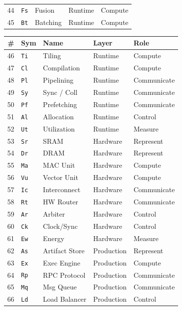 \begin{table}[!t]
\begin{minipage}[t]{0.49\textwidth}
\begin{tabular}{@{}r l l l l@{}}
44 & \texttt{Fs} & Fusion & Runtime & Compute \\
45 & \texttt{Bt} & Batching & Runtime & Compute \\
\bottomrule
\end{tabular}
\end{minipage}\hfill
\begin{minipage}[t]{0.49\textwidth}
\centering
\begin{tabular}{@{}r l l l l@{}}
\toprule
\textbf{\#} & \textbf{Sym} & \textbf{Name} & \textbf{Layer} & \textbf{Role} \\
\midrule
46 & \texttt{Ti} & Tiling & Runtime & Compute \\
47 & \texttt{Cl} & Compilation & Runtime & Compute \\
48 & \texttt{Pl} & Pipelining & Runtime & Communicate \\
49 & \texttt{Sy} & Sync / Coll & Runtime & Communicate \\
50 & \texttt{Pf} & Prefetching & Runtime & Communicate \\
51 & \texttt{Al} & Allocation & Runtime & Control \\
52 & \texttt{Ut} & Utilization & Runtime & Measure \\
53 & \texttt{Sr} & SRAM & Hardware & Represent \\
54 & \texttt{Dr} & DRAM & Hardware & Represent \\
55 & \texttt{Ma} & MAC Unit & Hardware & Compute \\
56 & \texttt{Vu} & Vector Unit & Hardware & Compute \\
57 & \texttt{Ic} & Interconnect & Hardware & Communicate \\
58 & \texttt{Rt} & HW Router & Hardware & Communicate \\
59 & \texttt{Ar} & Arbiter & Hardware & Control \\
60 & \texttt{Ck} & Clock/Sync & Hardware & Control \\
61 & \texttt{Ew} & Energy & Hardware & Measure \\
62 & \texttt{As} & Artifact Store & Production & Represent \\
63 & \texttt{Ex} & Exec Engine & Production & Compute \\
64 & \texttt{Rp} & RPC Protocol & Production & Communicate \\
65 & \texttt{Mq} & Msg Queue & Production & Communicate \\
66 & \texttt{Ld} & Load Balancer & Production & Control \\

\end{tabular}
\end{minipage}
\end{table}
